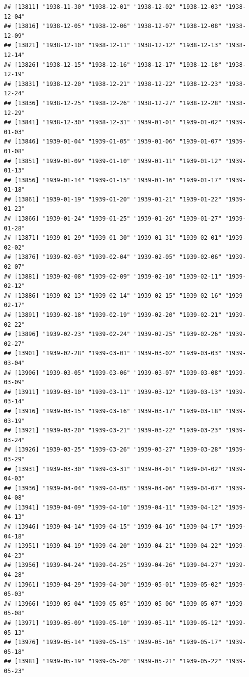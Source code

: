 \documentclass{article}\usepackage[]{graphicx}\usepackage[]{color}
\makeatletter
\newenvironment{kframe}{%
 \def\at@end@of@kframe{}%
 \ifinner\ifhmode%
  \def\at@end@of@kframe{\end{minipage}}%
  \begin{minipage}{\columnwidth}%
 \fi\fi%
 \def\FrameCommand##1{\hskip\@totalleftmargin \hskip-\fboxsep
 \colorbox{shadecolor}{##1}\hskip-\fboxsep
     \hskip-\linewidth \hskip-\@totalleftmargin \hskip\columnwidth}%
 \MakeFramed {\advance\hsize-\width
   \@totalleftmargin\z@ \linewidth\hsize
   \@setminipage}}%
 {\par\unskip\endMakeFramed%
 \at@end@of@kframe}
\newenvironment{knitrout}{}{} %
\makeatother
\begin{document}
\begin{description}
\begin{knitrout}
\begin{kframe}
\begin{verbatim}
## [13811] "1938-11-30" "1938-12-01" "1938-12-02" "1938-12-03" "1938-12-04"
## [13816] "1938-12-05" "1938-12-06" "1938-12-07" "1938-12-08" "1938-12-09"
## [13821] "1938-12-10" "1938-12-11" "1938-12-12" "1938-12-13" "1938-12-14"
## [13826] "1938-12-15" "1938-12-16" "1938-12-17" "1938-12-18" "1938-12-19"
## [13831] "1938-12-20" "1938-12-21" "1938-12-22" "1938-12-23" "1938-12-24"
## [13836] "1938-12-25" "1938-12-26" "1938-12-27" "1938-12-28" "1938-12-29"
## [13841] "1938-12-30" "1938-12-31" "1939-01-01" "1939-01-02" "1939-01-03"
## [13846] "1939-01-04" "1939-01-05" "1939-01-06" "1939-01-07" "1939-01-08"
## [13851] "1939-01-09" "1939-01-10" "1939-01-11" "1939-01-12" "1939-01-13"
## [13856] "1939-01-14" "1939-01-15" "1939-01-16" "1939-01-17" "1939-01-18"
## [13861] "1939-01-19" "1939-01-20" "1939-01-21" "1939-01-22" "1939-01-23"
## [13866] "1939-01-24" "1939-01-25" "1939-01-26" "1939-01-27" "1939-01-28"
## [13871] "1939-01-29" "1939-01-30" "1939-01-31" "1939-02-01" "1939-02-02"
## [13876] "1939-02-03" "1939-02-04" "1939-02-05" "1939-02-06" "1939-02-07"
## [13881] "1939-02-08" "1939-02-09" "1939-02-10" "1939-02-11" "1939-02-12"
## [13886] "1939-02-13" "1939-02-14" "1939-02-15" "1939-02-16" "1939-02-17"
## [13891] "1939-02-18" "1939-02-19" "1939-02-20" "1939-02-21" "1939-02-22"
## [13896] "1939-02-23" "1939-02-24" "1939-02-25" "1939-02-26" "1939-02-27"
## [13901] "1939-02-28" "1939-03-01" "1939-03-02" "1939-03-03" "1939-03-04"
## [13906] "1939-03-05" "1939-03-06" "1939-03-07" "1939-03-08" "1939-03-09"
## [13911] "1939-03-10" "1939-03-11" "1939-03-12" "1939-03-13" "1939-03-14"
## [13916] "1939-03-15" "1939-03-16" "1939-03-17" "1939-03-18" "1939-03-19"
## [13921] "1939-03-20" "1939-03-21" "1939-03-22" "1939-03-23" "1939-03-24"
## [13926] "1939-03-25" "1939-03-26" "1939-03-27" "1939-03-28" "1939-03-29"
## [13931] "1939-03-30" "1939-03-31" "1939-04-01" "1939-04-02" "1939-04-03"
## [13936] "1939-04-04" "1939-04-05" "1939-04-06" "1939-04-07" "1939-04-08"
## [13941] "1939-04-09" "1939-04-10" "1939-04-11" "1939-04-12" "1939-04-13"
## [13946] "1939-04-14" "1939-04-15" "1939-04-16" "1939-04-17" "1939-04-18"
## [13951] "1939-04-19" "1939-04-20" "1939-04-21" "1939-04-22" "1939-04-23"
## [13956] "1939-04-24" "1939-04-25" "1939-04-26" "1939-04-27" "1939-04-28"
## [13961] "1939-04-29" "1939-04-30" "1939-05-01" "1939-05-02" "1939-05-03"
## [13966] "1939-05-04" "1939-05-05" "1939-05-06" "1939-05-07" "1939-05-08"
## [13971] "1939-05-09" "1939-05-10" "1939-05-11" "1939-05-12" "1939-05-13"
## [13976] "1939-05-14" "1939-05-15" "1939-05-16" "1939-05-17" "1939-05-18"
## [13981] "1939-05-19" "1939-05-20" "1939-05-21" "1939-05-22" "1939-05-23"

\end{verbatim}
\end{kframe}
\end{knitrout}
\end{description}
\end{document}
